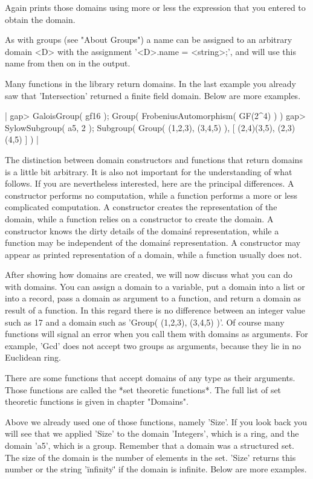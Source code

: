 Again {\GAP} prints those domains  using more or less the expression that
you entered to obtain the domain.

As  with  groups  (see  "About  Groups") a  name can  be assigned  to  an
arbitrary  domain <D> with the  assignment '<D>.name \:= <string>;',  and
{\GAP} will use this name from then on in the output.

Many functions in the {\GAP} library return domains.  In the last example
you already  saw that   'Intersection'  returned a finite  field  domain.
Below are more examples.

|    gap> GaloisGroup( gf16 );
    Group( FrobeniusAutomorphism( GF(2^4) ) )
    gap> SylowSubgroup( a5, 2 );
    Subgroup( Group( (1,2,3), (3,4,5) ), [ (2,4)(3,5), (2,3)(4,5) ] ) |

The distinction between domain  constructors  and functions  that  return
domains is  a little  bit arbitrary.   It  is also not important  for the
understanding of what  follows.  If you are nevertheless interested, here
are the  principal differences.   A constructor  performs no computation,
while  a function  performs  a more  or less complicated computation.   A
constructor creates  the representation of the domain,  while a  function
relies on a constructor to create  the domain.   A constructor  knows the
dirty  details  of the domain\'s  representation, while a function may be
independent of the domain\'s representation.  A constructor may appear as
printed representation of a domain, while a function usually does not.

After showing how domains are created, we will now  discuss what  you can
do with  domains.   You  can assign  a domain to a variable, put a domain
into a list or into  a  record, pass a domain  as argument to a function,
and return a  domain as result of a function.  In this regard there is no
difference  between  an integer  value such as 17 and  a  domain such  as
'Group( (1,2,3),  (3,4,5) )'.  Of  course  many functions  will signal an
error when  you call them with domains  as arguments.  For example, 'Gcd'
does not accept two groups as arguments, because they lie in no Euclidean
ring.

There  are  some functions  that  accept domains of  any  type  as  their
arguments.  Those functions  are called the  *set  theoretic  functions*.
The full list of set theoretic functions is given in chapter "Domains".

Above we already used one of those functions, namely 'Size'.  If you look
back you will see that we applied 'Size'  to the domain 'Integers', which
is a ring, and the domain 'a5', which is a group.  Remember that a domain
was a structured set.   The size of the domain  is the number of elements
in the set.  'Size' returns  this number or  the string '\"infinity\"' if
the domain  is infinite.  Below are more examples.

